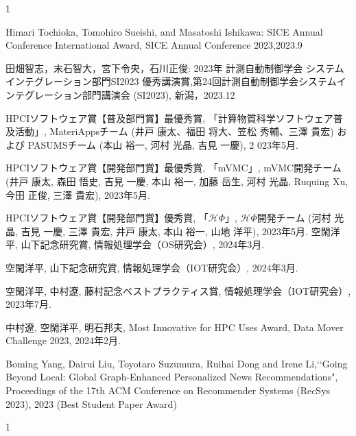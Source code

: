 \begin{受賞}{1}

Himari Tochioka, Tomohiro Sueishi, and Masatoshi Ishikawa: SICE Annual Conference International Award, SICE Annual Conference 2023,2023.9

田畑智志，末石智大，宮下令央，石川正俊: 2023年 計測自動制御学会 システムインテグレーション部門SI2023 優秀講演賞,第24回計測自動制御学会システムインテグレーション部門講演会 (SI2023), 新潟，2023.12

HPCIソフトウェア賞【普及部門賞】最優秀賞, 
「計算物質科学ソフトウェア普及活動」, 
MateriAppsチーム (井戸 康太、福田 将大、笠松 秀輔、三澤 貴宏) および PASUMSチーム (本山 裕一, 河村 光晶, 吉見 一慶), 2
023年5月.

HPCIソフトウェア賞【開発部門賞】最優秀賞,
「mVMC」, 
mVMC開発チーム (井戸 康太, 森田 悟史, 吉見 一慶, 本山 裕一, 加藤 岳生, 河村 光晶, Ruquing Xu, 今田 正俊, 三澤 貴宏), 
2023年5月.

HPCIソフトウェア賞【開発部門賞】優秀賞, 
「$\mathcal{H}\Phi$」, 
$\mathcal{H}\Phi$開発チーム (河村 光晶, 吉見 一慶, 三澤 貴宏, 井戸 康太, 本山 裕一, 山地 洋平), 
2023年5月.
空閑洋平, 山下記念研究賞, 情報処理学会（OS研究会）, 2024年3月.

空閑洋平, 山下記念研究賞, 情報処理学会（IOT研究会）, 2024年3月.

空閑洋平, 中村遼, 藤村記念ベストプラクティス賞, 情報処理学会（IOT研究会）, 2023年7月.

中村遼, 空閑洋平, 明石邦夫, Most Innovative for HPC Uses Award, Data Mover Challenge 2023, 2024年2月.


Boming Yang, Dairui Liu, Toyotaro Suzumura, Ruihai Dong and Irene Li,\lq\lq Going Beyond Local: Global Graph-Enhanced Personalized News Recommendations", Proceedings of the 17th ACM Conference on Recommender Systems  (RecSys 2023), 2023 (Best Student Paper Award)

\end{受賞}

\begin{著書}{1}

\end{著書}

